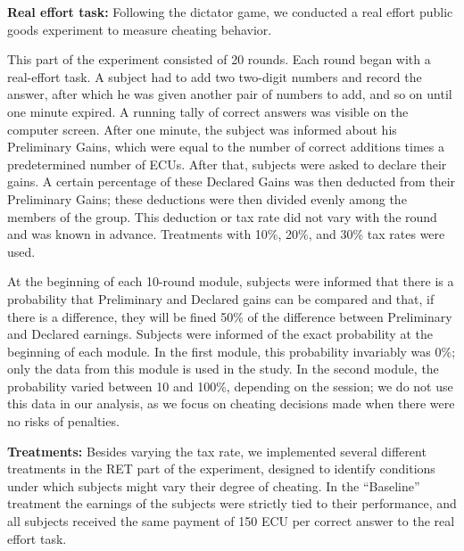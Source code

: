 \documentclass[9pt,twocolumn,twoside]{pnas-new}
\begin{document}
\textbf{Real effort task:}
Following the dictator game, we conducted a real effort 
public goods experiment to measure cheating behavior. 

This part of the experiment consisted of 20 rounds. Each round began with a real-effort task. A subject had to add two two-digit numbers and record the answer, after which he was given another pair of numbers to add, and so on until one minute expired. A running tally of correct answers was visible on the computer screen. After one minute, the subject was informed about his Preliminary Gains, which were equal to the number of correct additions times a predetermined number of ECUs. After that, subjects were asked to declare their gains. A certain
percentage of these Declared Gains was then deducted from their
Preliminary Gains; these deductions were then divided evenly among the members of the group. This deduction or tax rate did not vary with the round and was known in advance. Treatments with 
10\%, 20\%, and 30\% tax rates were used.\footnotemark{} 

At the beginning of each 10-round module, subjects were informed that there is a probability that Preliminary and Declared gains can be compared and that, if there is a difference, they will be fined 50\% of the difference between Preliminary and Declared earnings.\footnotemark{}
Subjects were informed of the exact probability at the beginning of each module. In the first module, this probability invariably was 0\%; only the data from this module is used in the study. In the second module, the probability varied between 10 and 100\%, depending on the session;  we do not use this data in our analysis, as we focus on cheating decisions made when there were no risks of penalties. 

\textbf{Treatments:}
Besides varying the tax rate, we implemented several different treatments in the RET part of the experiment, designed to identify conditions under which subjects might vary their degree of cheating. In the  ``Baseline'' treatment the earnings of the subjects were strictly tied to their performance, and all subjects received the same payment of 150 ECU per correct answer to the real effort task. 
\end{document}
